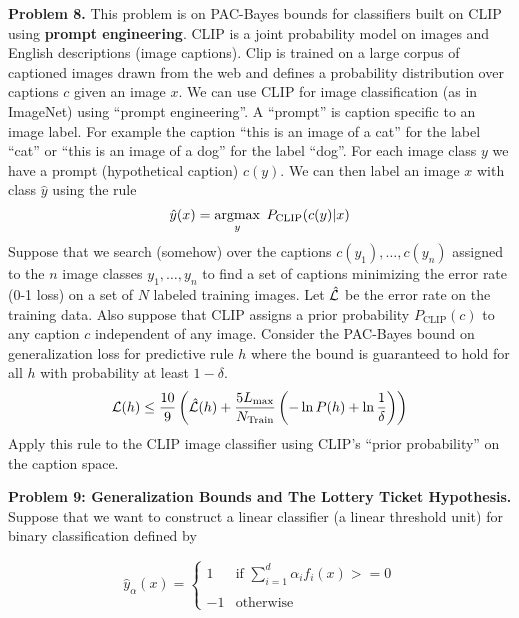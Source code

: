 \documentclass{article}
\newcommand{\solution}[1]{}
\begin{document}
\bigskip
{\bf Problem 8.} This problem is on PAC-Bayes bounds for classifiers built on CLIP using {\bf prompt engineering}.  CLIP is a joint probability model on images
and English descriptions (image captions).  Clip is trained on a large corpus of captioned images drawn from the web and defines a probability distribution over captions $c$ given an image $x$.
We can use CLIP for image classification (as in ImageNet) using ``prompt engineering''.  A ``prompt'' is caption specific to an image label.  For example the caption ``this is an image of a cat'' for the label ``cat'' or ``this is an image of a dog''
for the label ``dog''. For each image class $y$ we have a prompt (hypothetical caption) $c(y)$.
We can then label an image $x$ with class $\hat{y}$ using the rule
$$\hat{y}(x) = \operatorname*{argmax}_y \;P_{\mathrm{CLIP}}(c(y)|x)$$
Suppose that we search (somehow) over the captions $c(y_1),\ldots,c(y_n)$ assigned to the $n$
image classes $y_1,\ldots,y_n$ to find a set of captions minimizing the error rate (0-1 loss) on a set of $N$ labeled training images.  Let $\hat{\cal L}$ be the error rate on the training data.
Also suppose that CLIP assigns a prior probability $P_{\mathrm{CLIP}}(c)$ to any caption $c$ independent of any image.  Consider the PAC-Bayes bound on generalization loss for predictive rule $h$
where the bound is guaranteed to hold for all $h$ with probability at least $1-\delta$.
$${\cal L}(h) \leq \frac{10}{9}\left(\hat{{\cal L}}(h) + \frac{5L_{\max}}{N_\mathrm{Train}}\left(- \ln P(h) +\ln\frac{1}{\delta}\right)\right)$$
Apply this rule to the CLIP image classifier using CLIP's ``prior probability'' on the caption space.

\solution{
  $${\cal L}(h) \leq \frac{10}{9}\left(\hat{{\cal L}}(h) + \frac{5}{N}\left(\left(\sum_y - \ln P_{\mathrm{CLIP}}(c(y))\right) +\ln\frac{1}{\delta}\right)\right)$$

  I am not proposing that searching over all captions is a good idea.  Some narrower prior is called for.
}

\bigskip
    {\bf Problem 9: Generalization Bounds and The Lottery Ticket Hypothesis.}  Suppose that we want to construct a linear classifier (a linear threshold unit) for binary classification defined by

    $$\hat{y}_\alpha(x) = \left\{\begin{array}{ll} 1 & \mbox{if $\sum_{i = 1}^d \alpha_i f_i(x) >= 0$} \\ \\ -1 & \mbox{otherwise}\end{array}\right.$$
\end{document}
